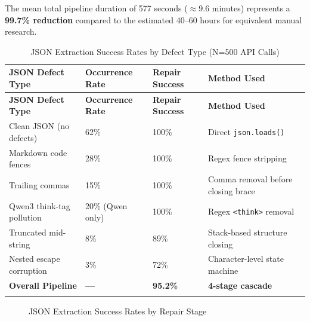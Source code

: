 \documentclass[a4paper,12pt,openany]{report}
\begin{document}
The mean total pipeline duration of 577 seconds ($\approx$9.6 minutes) represents a \textbf{99.7\% reduction} compared to the estimated 40--60 hours for equivalent manual research.

\begin{longtable}{|p{4cm}|p{2.5cm}|p{2.5cm}|p{3cm}|}
\hline
\textbf{JSON Defect Type} & \textbf{Occurrence Rate} & \textbf{Repair Success} & \textbf{Method Used} \\
\hline
\endfirsthead
\hline
\textbf{JSON Defect Type} & \textbf{Occurrence Rate} & \textbf{Repair Success} & \textbf{Method Used} \\
\hline
\endhead
\hline
\endfoot
Clean JSON (no defects) & 62\% & 100\% & Direct \texttt{json.loads()} \\
\hline
Markdown code fences & 28\% & 100\% & Regex fence stripping \\
\hline
Trailing commas & 15\% & 100\% & Comma removal before closing brace \\
\hline
Qwen3 think-tag pollution & 20\% (Qwen only) & 100\% & Regex \texttt{<think>} removal \\
\hline
Truncated mid-string & 8\% & 89\% & Stack-based structure closing \\
\hline
Nested escape corruption & 3\% & 72\% & Character-level state machine \\
\hline
\textbf{Overall Pipeline} & \textbf{---} & \textbf{95.2\%} & \textbf{4-stage cascade} \\
\hline

\caption{JSON Extraction Success Rates by Defect Type (N=500 API Calls)}
\label{tab:json_success}
\end{longtable}

\begin{figure}[H]
\centering
{}
\caption{JSON Extraction Success Rates by Repair Stage}
\label{fig:json_success}
\end{figure}
\end{document}
